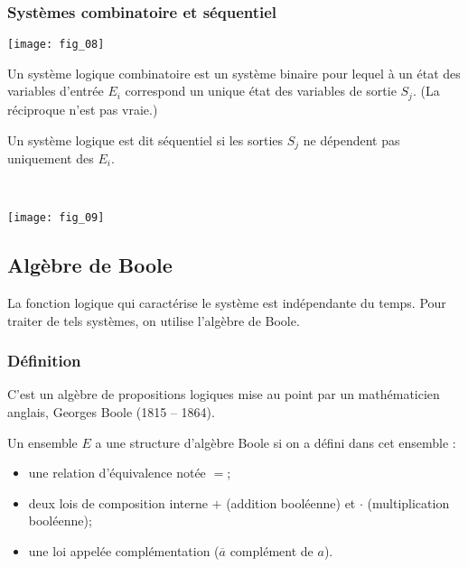 \subsubsection{Systèmes combinatoire et séquentiel}


\begin{marginfigure}
\texttt{[image: fig\_08]}
\end{marginfigure}

\begin{defi}
Un système logique combinatoire est un système binaire pour lequel à un état des variables d'entrée $E_i$ correspond un unique état des variables de sortie $S_j$. (La réciproque n'est pas vraie.)
\end{defi}


\begin{defi}
Un système logique est dit séquentiel si les sorties $S_j$ ne dépendent pas uniquement des $E_i$.
\end{defi}

\begin{exemple} ~\\

\begin{center}
\texttt{[image: fig\_09]}
\end{center}

\end{exemple}


\subsection{Algèbre de Boole}

La fonction logique qui caractérise le système est indépendante du temps. Pour traiter de tels systèmes, on utilise l'algèbre de Boole. 

\subsubsection{Définition}
C'est un algèbre de propositions logiques mise au point par un mathématicien anglais, Georges Boole (1815 -- 1864).

\begin{defi}
Un ensemble $E$ a une structure d'algèbre Boole si on a défini dans cet ensemble :
\begin{itemize}
\item une relation d'équivalence notée $=$;
\item deux lois de composition interne $+$ (addition booléenne) et $\cdot$ (multiplication booléenne);
\item une loi appelée complémentation ($\overline{a}$ complément de $a$).
\end{itemize}
\end{defi}

